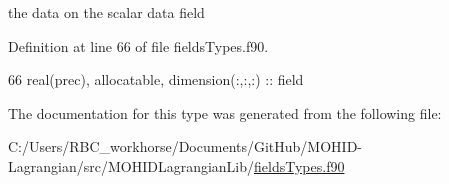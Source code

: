 the data on the scalar data field 



Definition at line 66 of file fields\+Types.\+f90.


\begin{DoxyCode}
66         \textcolor{keywordtype}{real(prec)}, \textcolor{keywordtype}{allocatable}, \textcolor{keywordtype}{dimension(:,:,:)} :: field
\end{DoxyCode}


The documentation for this type was generated from the following file\+:\begin{DoxyCompactItemize}
\item 
C\+:/\+Users/\+R\+B\+C\+\_\+workhorse/\+Documents/\+Git\+Hub/\+M\+O\+H\+I\+D-\/\+Lagrangian/src/\+M\+O\+H\+I\+D\+Lagrangian\+Lib/\mbox{\hyperlink{fields_types_8f90}{fields\+Types.\+f90}}\end{DoxyCompactItemize}
